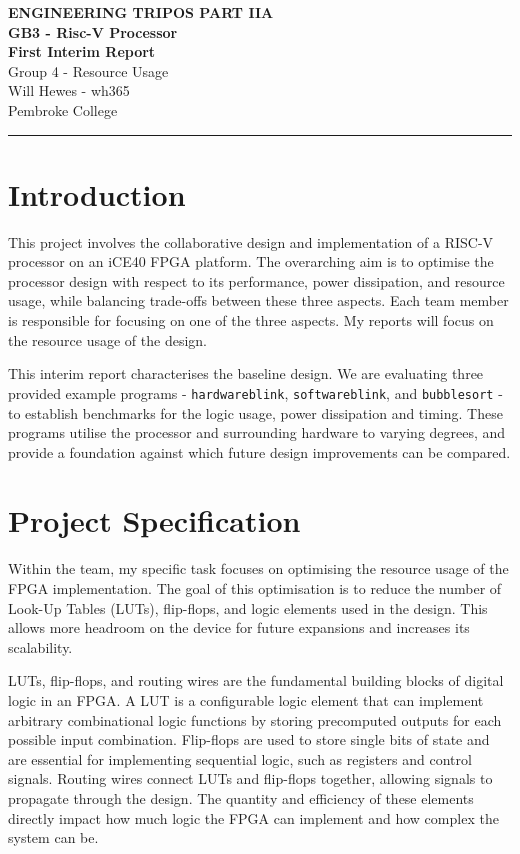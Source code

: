 \documentclass[a4paper,10pt]{article}
\renewcommand{\maketitle}{
    \begin{center}
        \LARGE \textbf{ENGINEERING TRIPOS PART IIA} \\ 
        \vspace{0.5em}
        \Large \textbf{GB3 - Risc-V Processor} \\ 
        \vspace{0.5em}
        \textbf{First Interim Report} \\
        \large Group 4 - Resource Usage \\
        \vspace{1em}
        \large Will Hewes - wh365 \\ 
        Pembroke College \\ 
        \vspace{0.5em}
    \end{center}
}
\begin{document}
\maketitle
\hrule
\tableofcontents
\newpage

\section{Introduction}
\label{sec:Introduction}

This project involves the collaborative design and implementation 
of a RISC-V processor on an iCE40 FPGA platform. 
The overarching aim is to optimise 
the processor design with respect to its 
performance, power dissipation, and resource usage, 
while balancing trade-offs between these three aspects. 
Each team member is responsible for focusing on one of the three aspects.
My reports will focus on the resource usage of the design.

This interim report characterises the baseline design. 
We are evaluating three provided example programs - 
\texttt{hardwareblink}, \texttt{softwareblink}, and \texttt{bubblesort} - 
to establish benchmarks for the logic usage, power dissipation and timing. 
These programs utilise the processor and surrounding hardware to varying degrees, 
and provide a foundation against which future design improvements can be compared.


\section{Project Specification}
\label{sec:Project_Specification}

Within the team, my specific task focuses on 
optimising the resource usage of the FPGA implementation. 
The goal of this optimisation is to reduce the number of 
Look-Up Tables (LUTs), flip-flops, and logic elements used in the design. 
This allows more headroom on the device for future expansions 
and increases its scalability.

LUTs, flip-flops, and routing wires are 
the fundamental building blocks of digital logic in an FPGA. 
A LUT is a configurable logic element that can implement 
arbitrary combinational logic functions 
by storing precomputed outputs for each possible input combination. 
Flip-flops are used to store single bits of state and 
are essential for implementing sequential logic, 
such as registers and control signals. 
Routing wires connect LUTs and flip-flops together, 
allowing signals to propagate through the design. 
The quantity and efficiency of these elements directly impact 
how much logic the FPGA can implement and how complex the system can be.
\end{document}
